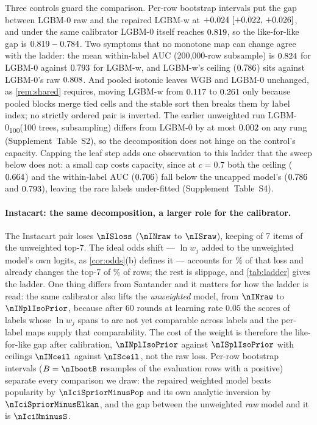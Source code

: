 \documentclass[sigconf,nonacm]{acmart}
\newcommand{\Sm}{\textsf{LGBM-w}\xspace}
\newcommand{\Wm}{\textsf{WGB}\xspace}
\newcommand{\Nm}{\textsf{LGBM-0}\xspace}
\newcommand{\Nhm}{\textsf{LGBM-0\textsubscript{100}}\xspace}
\newcommand{\Supp}[1]{Supplement~#1}  %
\begin{document}
Three controls guard the comparison. Per-row bootstrap intervals put the gap between \Nm raw and the repaired \Sm at $+0.024~[+0.022,\,+0.026]$, and under the same calibrator \Nm itself reaches $0.819$, so the like-for-like gap is $0.819-0.784$. Two symptoms that no monotone map can change agree with the ladder: the mean within-label AUC (200{,}000-row subsample) is $0.824$ for \Nm against $0.793$ for \Sm, and \Sm's ceiling ($0.786$) sits against \Nm's raw $0.808$. And pooled isotonic leaves \Wm and \Nm unchanged, as \cref{rem:shared} requires, moving \Sm from $0.117$ to $0.261$ only because pooled blocks merge tied cells and the stable sort then breaks them by label index; no strictly ordered pair is inverted. The earlier unweighted run \Nhm (100 trees, subsampling) differs from \Nm by at most $0.002$ on any rung (\Supp{Table~S2}), so the decomposition does not hinge on the control's capacity. Capping the leaf step adds one observation to this ladder that the sweep below does not: a small cap costs capacity, since at $c=0.7$ both the ceiling ($0.664$) and the within-label AUC ($0.706$) fall below the uncapped model's ($0.786$ and $0.793$), leaving the rare labels under-fitted (\Supp{Table~S4}).

\paragraph{Instacart: the same decomposition, a larger role for the calibrator.} The Instacart pair loses $\nISloss$ ($\nINraw$ to $\nISraw$), keeping \nIoverlapS{} of 7 items of the unweighted top-7. The ideal odds shift --- $\ln w_j$ added to the unweighted model's own logits, as \cref{cor:odds}(b) defines it --- accounts for \nIoddsShare\% of that loss and already changes the top-7 of \nIfracRowsChangedWhatif\% of rows; the rest is slippage, and \cref{tab:ladder} gives the ladder. One thing differs from Santander and it matters for how the ladder is read: the same calibrator also lifts the \emph{unweighted} model, from $\nINraw$ to $\nINplIsoPrior$, because after 60 rounds at learning rate $0.05$ the scores of \nInLabels{} labels whose $\ln w_j$ spans \nIlnwMin{} to \nIlnwMax{} are not yet comparable across labels and the per-label maps supply that comparability. The cost of the weight is therefore the like-for-like gap after calibration, $\nINplIsoPrior$ against $\nISplIsoPrior$ with ceilings $\nINceil$ against $\nISceil$, not the raw loss. Per-row bootstrap intervals ($B=\nIbootB$ resamples of the \nIbootN{} evaluation rows with a positive) separate every comparison we draw: the repaired weighted model beats popularity by $\nIciSpriorMinusPop$ and its own analytic inversion by $\nIciSpriorMinusElkan$, and the gap between the unweighted \emph{raw} model and it is $\nIciNminusS$.
\end{document}
